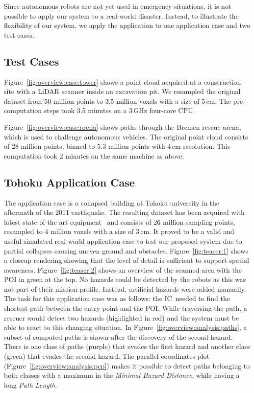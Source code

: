 \documentclass[conference,10pt,letter]{IEEEtran}
\def\IC{IC}
\begin{document}
Since autonomous robots are not yet used in emergency situations, it is not possible to apply our system to a real-world disaster. Instead, to illustrate the flexibility of our system, we apply the application to one application case and two test cases.

\subsection{Test Cases} \label{sec:results:testcases}
 Figure~\ref{fig:overview:case:tower} shows a point cloud acquired at a construction site with a LiDAR scanner inside an excavation pit. We resampled the original dataset from $50$ million points to $3.5$ million voxels with a size of 5\,cm. The pre-computation steps took 3.5 minutes on a 3\,GHz four-core CPU.

 Figure~\ref{fig:overview:case:arena} shows paths through the Bremen rescue arena, which is used to challenge autonomous vehicles. The original point cloud consists of $28$ million points, binned to $5.3$ million points with 4\,cm resolution. This computation took 2 minutes on the same machine as above.

\subsection{Tohoku Application Case} \label{sec:results:applicationcase}
The application case is a collapsed building at Tohoku university in the aftermath of the 2011 earthquake. The resulting dataset has been acquired with latest state-of-the-art equipment~\cite{journals/jfr/NagataniKOOYTNYKFK13} and consists of $26$ million sampling points, resampled to $4$ million voxels with a size of 3\,cm. It proved to be a valid and useful simulated real-world application case to test our proposed system due to partial collapses causing uneven ground and obstacles. Figure~\ref{fig:teaser:1} shows a closeup rendering showing that the level of detail is sufficient to support spatial awareness. Figure~\ref{fig:teaser:2} shows an overview of the scanned area with the POI in green at the top. No hazards could be detected by the robots as this was not part of their mission profile. Instead, artificial hazards were added manually. The task for this application case was as follows: the \IC\ needed to find the shortest path between the entry point and the POI. While traversing the path, a rescuer would detect two hazards (highlighted in red) and the system must be able to react to this changing situation. In Figure~\ref{fig:overview:analysis:paths}, a subset of computed paths is shown after the discovery of the second hazard. There is one class of paths (purple) that evades the first hazard and another class (green) that evades the second hazard. The parallel coordinates plot (Figure~\ref{fig:overview:analysis:pcp}) makes it possible to detect paths belonging to both classes with a maximum in the \emph{Minimal Hazard Distance}, while having a long \emph{Path Length}.
\end{document}
